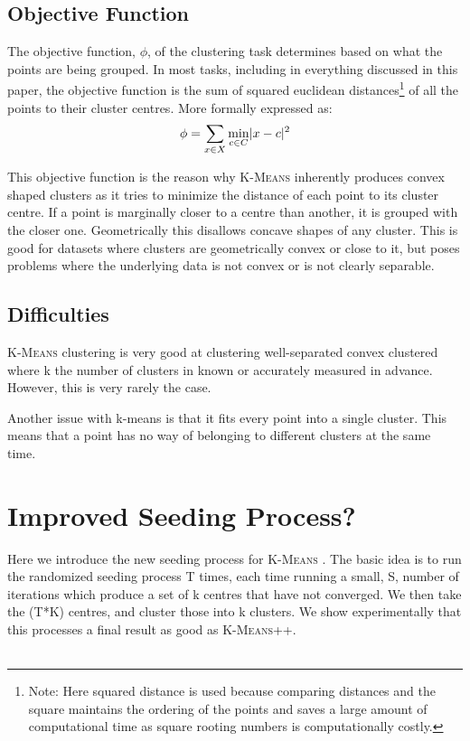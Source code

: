\documentclass[12pt]{dalthesis}
\newcommand*{\kmeans}{\textsc{K-Means} } %
\newcommand*{\kmeansn}{\textsc{K-Means}} %
\DeclarePairedDelimiter\abs{\lvert}{\rvert}
\begin{document}
\section{Objective Function}
The objective function, $\phi$, of the clustering task determines based on what the points are being grouped. In most tasks, including in everything discussed in this paper, the objective function is the sum of squared euclidean distances\footnote{Note: Here squared distance is used because comparing distances and the square maintains the ordering of the points and saves a large amount of computational time as square rooting numbers is computationally costly.}
of all the points to their cluster centres. More formally expressed as:
$$\phi = \sum_{x\in X} \min_{c\in C}\abs{ x-c}^2$$

This objective function is the reason why \kmeans inherently produces convex shaped clusters as it tries to minimize the distance of each point to its cluster centre. If a point is marginally closer to a centre than another, it is grouped with the closer one. Geometrically this disallows concave shapes of any cluster. This is good for datasets where clusters are geometrically convex or close to it, but poses problems where the underlying data is not convex or is not clearly separable.

\section{Difficulties}

\kmeans clustering is very good at clustering well-separated convex clustered where k the number of clusters in known or accurately measured in advance. However, this is very rarely the case.

Another issue with k-means is that it fits every point into a single cluster. This means that a point has no way of belonging to different clusters at the same time. 


\chapter{Improved Seeding Process?}

Here we introduce the new seeding process for \kmeans. The basic idea is to run the randomized seeding process T times, each time running a small, S, number of iterations which produce a set of k centres that have not converged. We then take the (T*K) centres, and cluster those into k clusters. We show experimentally that this processes a final result as good as \kmeansn++.
\\~\\
\end{document}
